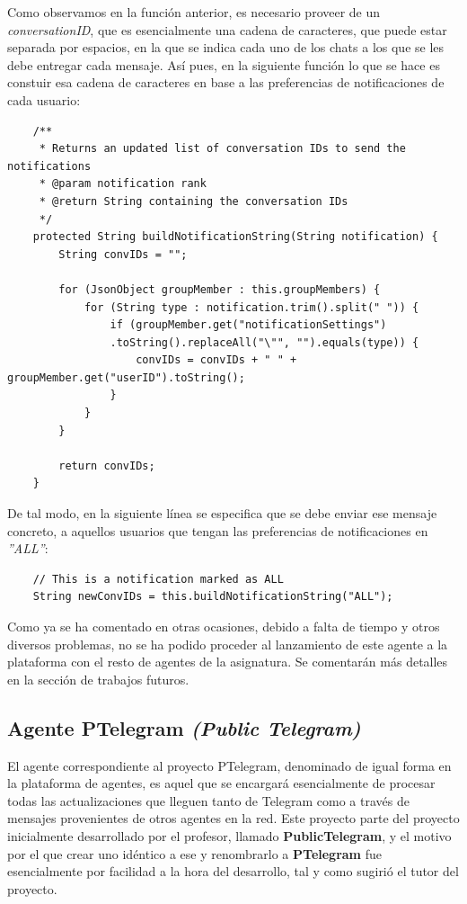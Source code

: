 Como observamos en la función anterior, es necesario proveer de un \textit{conversationID}, que es esencialmente una cadena de caracteres, que puede estar separada por espacios, en la que se indica cada uno de los chats a los que se les debe entregar cada mensaje. Así pues, en la siguiente función lo que se hace es constuir esa cadena de caracteres en base a las preferencias de notificaciones de cada usuario:\\

\begin{lstlisting}
    /**
     * Returns an updated list of conversation IDs to send the notifications
     * @param notification rank
     * @return String containing the conversation IDs
     */
    protected String buildNotificationString(String notification) {
        String convIDs = "";
        
        for (JsonObject groupMember : this.groupMembers) {
            for (String type : notification.trim().split(" ")) {
                if (groupMember.get("notificationSettings")
                .toString().replaceAll("\"", "").equals(type)) {
                    convIDs = convIDs + " " + groupMember.get("userID").toString();
                }
            }
        }
        
        return convIDs;
    }
\end{lstlisting}

De tal modo, en la siguiente línea se especifica que se debe enviar ese mensaje concreto, a aquellos usuarios que tengan las preferencias de notificaciones en \textit{''ALL''}:\\

\begin{lstlisting}
    // This is a notification marked as ALL
    String newConvIDs = this.buildNotificationString("ALL");
\end{lstlisting}

Como ya se ha comentado en otras ocasiones, debido a falta de tiempo y otros diversos problemas, no se ha podido proceder al lanzamiento de este agente a la plataforma con el resto de agentes de la asignatura. Se comentarán más detalles en la sección de trabajos futuros.

\subsection{Agente PTelegram \textit{(Public Telegram)}}

El agente correspondiente al proyecto PTelegram, denominado de igual forma en la plataforma de agentes, es aquel que se encargará esencialmente de procesar todas las actualizaciones que lleguen tanto de Telegram como a través de mensajes provenientes de otros agentes en la red. Este proyecto parte del proyecto inicialmente desarrollado por el profesor, llamado \textbf{PublicTelegram}, y el motivo por el que crear uno idéntico a ese y renombrarlo a \textbf{PTelegram} fue esencialmente por facilidad a la hora del desarrollo, tal y como sugirió el tutor del proyecto.\\

